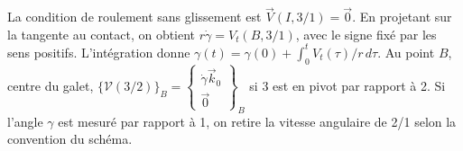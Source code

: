 \begin{corrigebox}
La condition de roulement sans glissement est
                $\vec V(I,3/1)=\vec0$. En projetant sur la tangente au contact, on obtient
                $r\dot\gamma=V_t(B,3/1)$, avec le signe fixé par les sens positifs.
                L'intégration donne $\gamma(t)=\gamma(0)+\int_0^t V_t(\tau)/r\,d\tau$.
Au point $B$, centre du galet,
                $\{\mathcal V(3/2)\}_B=\left\{\begin{array}{c}
                \dot\gamma\vec k_0\\\vec0\end{array}\right\}_B$ si 3 est en pivot
                par rapport à 2. Si l'angle $\gamma$ est mesuré par rapport à 1, on retire
                la vitesse angulaire de 2/1 selon la convention du schéma.
\end{corrigebox}
